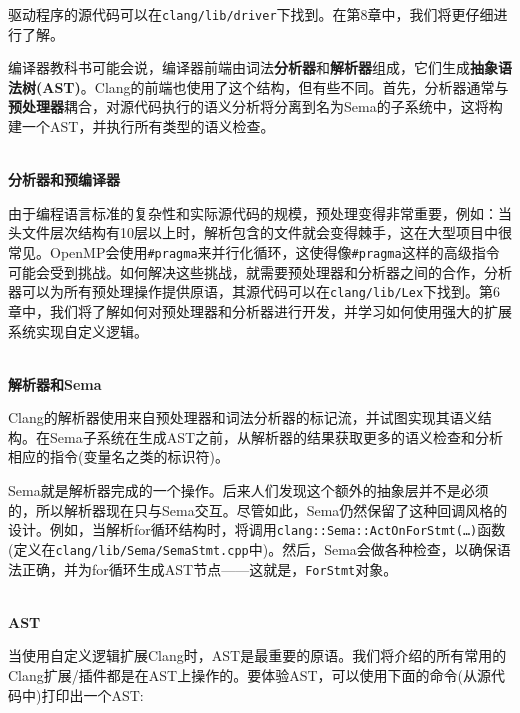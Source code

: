 驱动程序的源代码可以在\texttt{clang/lib/driver}下找到。在第8章中，我们将更仔细进行了解。


编译器教科书可能会说，编译器前端由词法\textbf{分析器}和\textbf{解析器}组成，它们生成\textbf{抽象语法树(AST)}。Clang的前端也使用了这个结构，但有些不同。首先，分析器通常与\textbf{预处理器}耦合，对源代码执行的语义分析将分离到名为Sema的子系统中，这将构建一个AST，并执行所有类型的语义检查。

\hspace*{\fill} \\ %
\noindent
\textbf{分析器和预编译器}

由于编程语言标准的复杂性和实际源代码的规模，预处理变得非常重要，例如：当头文件层次结构有10层以上时，解析包含的文件就会变得棘手，这在大型项目中很常见。OpenMP会使用\texttt{\#pragma}来并行化循环，这使得像\texttt{\#pragma}这样的高级指令可能会受到挑战。如何解决这些挑战，就需要预处理器和分析器之间的合作，分析器可以为所有预处理操作提供原语，其源代码可以在\texttt{clang/lib/Lex}下找到。第6章中，我们将了解如何对预处理器和分析器进行开发，并学习如何使用强大的扩展系统实现自定义逻辑。

\hspace*{\fill} \\ %
\noindent
\textbf{解析器和Sema}

Clang的解析器使用来自预处理器和词法分析器的标记流，并试图实现其语义结构。在Sema子系统在生成AST之前，从解析器的结果获取更多的语义检查和分析相应的指令(变量名之类的标识符)。

Sema就是解析器完成的一个操作。后来人们发现这个额外的抽象层并不是必须的，所以解析器现在只与Sema交互。尽管如此，Sema仍然保留了这种回调风格的设计。例如，当解析for循环结构时，将调用\texttt{clang::Sema::ActOnForStmt(…)}函数(定义在\texttt{clang/lib/Sema/SemaStmt.cpp}中)。然后，Sema会做各种检查，以确保语法正确，并为for循环生成AST节点——这就是，\texttt{ForStmt}对象。

\hspace*{\fill} \\ %
\noindent
\textbf{AST}

当使用自定义逻辑扩展Clang时，AST是最重要的原语。我们将介绍的所有常用的Clang扩展/插件都是在AST上操作的。要体验AST，可以使用下面的命令(从源代码中)打印出一个AST:


